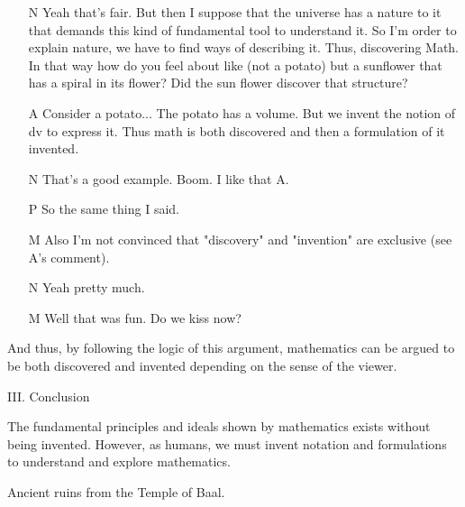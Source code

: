 \documentclass[11pt]{article}
\begin{document}
\begin{multicols}{2}
\begin{enumerate}
	The simple examples are probably the best way to go about this type stuff.
	\item[N] Yeah that's fair. But then I suppose that the universe has a nature to it that demands this kind of fundamental tool to understand it. So I'm order to explain nature, we have to find ways of describing it. Thus, discovering Math.
	In that way how do you feel about like (not a potato) but a sunflower that has a spiral in its flower? Did the sun flower discover that structure?
	\item[A] Consider a potato... The potato has a volume. But we invent the notion of dv to express it. Thus math is both discovered and then a formulation of it invented.
	\item[N] That's a good example.	Boom. I like that A.
	\item[P] So the same thing I said.
	\item[M] Also I'm not convinced that "discovery" and "invention" are exclusive (see A's comment).
	\item[N] Yeah pretty much.
	\item[M] Well that was fun. Do we kiss now?
\end{enumerate}

And thus, by following the logic of this argument, mathematics can be argued to be both discovered and invented depending on the sense of the viewer.

\begin{center}
	III. Conclusion
\end{center}

The fundamental principles and ideals shown by mathematics exists without being invented. However, as humans, we must invent notation and formulations to understand and explore mathematics.


\begin{thebibliography}{9}
	{\footnotesize
	 Ancient ruins from the Temple of Baal. 
	}
\end{thebibliography}
\end{multicols}

\end{document}
